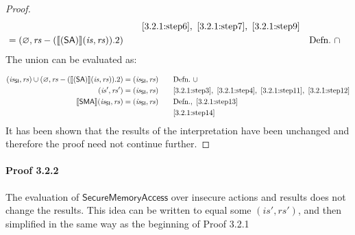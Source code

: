 \documentclass[12pt, letterpaper]{article}
\let\emptyset\varnothing
\newcommand\interp[1]{\llbracket #1 \rrbracket}
\begin{document}
\begin{proof}
{\begin{alignat}{2}
     &&\quad \ref{3.2.1:step6},\ \ref{3.2.1:step7},\ \ref{3.2.1:step9}
     \\
     \label{3.2.1:step11}
     &=
     (\emptyset, \mathit{rs} - (\interp{ (\mathsf{SA}) } (\mathit{is}, \mathit{rs})).2)
     &&\quad \text{Defn.}\ \cap
 \end{alignat}
 }%
     The union can be evaluated as:
 \par\nobreak
 {\fontsize{10pt}{12pt}\selectfont
 \begin{alignat}{2}
     \label{3.2.1:step12}
     (\mathit{is_{\mathsf{SI}}}, \mathit{rs}) \cup 
     (\emptyset, \mathit{rs} - (\interp{ (\mathsf{SA}) } (\mathit{is}, \mathit{rs})).2)
     &=
     (\mathit{is_{\mathsf{SI}}}, \mathit{rs})
     &&\quad \text{Defn.}\ \cup
     \\
     \label{3.2.1:step13}
     (\mathit{is}', \mathit{rs}')
     &=
     (\mathit{is_{\mathsf{SI}}}, \mathit{rs})
     &&\quad \ref{3.2.1:step3},\ \ref{3.2.1:step4},\ \ref{3.2.1:step11},\ \ref{3.2.1:step12}
     \\
     \label{3.2.1:step14}
     \interp{ \mathsf{SMA} } (\mathit{is_{\mathsf{SI}}}, \mathit{rs})
     &=
     (\mathit{is_{\mathsf{SI}}}, \mathit{rs})
     &&\quad \text{Defn.},\ \ref{3.2.1:step13}
     \\
     \label{3.2.1:qed}
     &\qedhere
     &&\quad \ref{3.2.1:step14}
 \end{alignat}
 }%
     It has been shown that the results of the interpretation have been unchanged and therefore the proof need not continue further.
 \end{proof}

 \paragraph{Proof 3.2.2}
     The evaluation of $\mathsf{SecureMemoryAccess}$ over insecure actions and results does not change the results.  This idea can be written to equal some $(\mathit{is}', \mathit{rs}')$, and then simplified in the same way as the beginning of Proof 3.2.1
\end{document}
